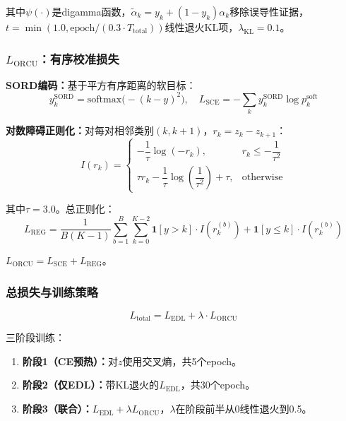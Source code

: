 \documentclass[12pt,a4paper]{ctexart}
\begin{document}
其中$\psi(\cdot)$是digamma函数，$\tilde{\alpha}_k = y_k + (1 - y_k)\alpha_k$移除误导性证据，$t = \min(1.0, \mathrm{epoch} / (0.3 \cdot T_{\mathrm{total}}))$线性退火KL项，$\lambda_{\mathrm{KL}} = 0.1$。

\subsubsection{$L_{\mathrm{ORCU}}$：有序校准损失}

\textbf{SORD编码\cite{diaz2018sord}：}基于平方有序距离的软目标：
\begin{equation}
    y_k^{\mathrm{SORD}} = \mathrm{softmax}\big(-(k - y)^2\big), \quad L_{\mathrm{SCE}} = -\sum_k y_k^{\mathrm{SORD}} \log p_k^{\mathrm{soft}}
\end{equation}

\textbf{对数障碍正则化：}对每对相邻类别$(k, k+1)$，$r_k = z_k - z_{k+1}$：
\begin{equation}
    I(r_k) = \begin{cases}
        -\dfrac{1}{\tau}\log(-r_k), & r_k \leq -\dfrac{1}{\tau^2} \\[10pt]
        \tau r_k - \dfrac{1}{\tau}\log\left(\dfrac{1}{\tau^2}\right) + \tau, & \text{otherwise}
    \end{cases}
\end{equation}

其中$\tau = 3.0$。总正则化：
\begin{equation}
    L_{\mathrm{REG}} = \frac{1}{B(K-1)} \sum_{b=1}^{B} \sum_{k=0}^{K-2} \mathbf{1}[y > k] \cdot I(r_k^{(b)}) + \mathbf{1}[y \leq k] \cdot I(r_k^{(b)})
\end{equation}

$L_{\mathrm{ORCU}} = L_{\mathrm{SCE}} + L_{\mathrm{REG}}$。

\subsubsection{总损失与训练策略}

\begin{equation}
    L_{\mathrm{total}} = L_{\mathrm{EDL}} + \lambda \cdot L_{\mathrm{ORCU}}
\end{equation}

三阶段训练：
\begin{enumerate}
    \item \textbf{阶段1（CE预热）：}对$z$使用交叉熵，共5个epoch。
    \item \textbf{阶段2（仅EDL）：}带KL退火的$L_{\mathrm{EDL}}$，共30个epoch。
    \item \textbf{阶段3（联合）：}$L_{\mathrm{EDL}} + \lambda L_{\mathrm{ORCU}}$，$\lambda$在阶段前半从0线性退火到0.5。
\end{enumerate}
\end{document}
